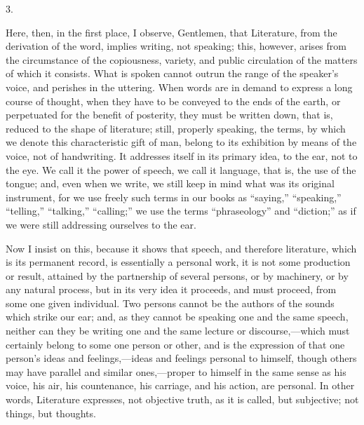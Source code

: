 3.

Here, then, in the first place, I observe, Gentlemen, that
Literature, from the derivation of the word, implies writing,
not speaking; this, however, arises from the circumstance of the
copiousness, variety, and public circulation of the matters of which
it consists. What is spoken cannot outrun the range of the speaker's
voice, and perishes in the uttering. When words are in demand to
express a long course of thought, when they have to be conveyed to the
ends of the earth, or perpetuated for the benefit of posterity, they
must be written down, that is, reduced to the shape of literature;
still, properly speaking, the terms, by which we denote this
characteristic gift of man, belong to its exhibition by means of the
voice, not of handwriting. It addresses itself in its primary idea, to
the ear, not to the eye. We call it the power of speech, we call it
language, that is, the use of the tongue; and, even when we write, we
still keep in mind what was its original instrument, for we use freely
such terms in our books as ``saying,'' ``speaking,''
``telling,'' ``talking,'' ``calling;'' we use
the terms ``phraseology'' and ``diction;'' as if we
were still addressing ourselves to the ear.

Now I insist on this, because it shows that speech, and therefore
literature, which is its permanent record, is essentially a personal
work, it is not some production or result, attained by the partnership
of several persons, or by machinery, or by any natural process, but in
its very idea it proceeds, and must proceed, from some one given
individual. Two persons cannot be the authors of the sounds which
strike our ear; and, as they cannot be speaking one and the same
speech, neither can they be writing one and the same lecture or
discourse,—which must certainly belong to some one person or other,
and is the expression of that one person's ideas and feelings,—ideas
and feelings personal to himself, though others may have parallel and
similar ones,—proper to himself in the same sense as his
voice, his air, his countenance, his carriage, and his action, are
personal. In other words, Literature expresses, not objective truth,
as it is called, but subjective; not things, but thoughts.

